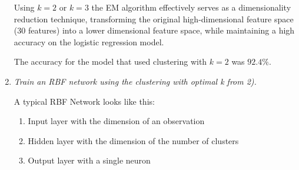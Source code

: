 \documentclass{article}
\begin{document}
\begin{enumerate}
Using $k=2$ or $k=3$ the EM algorithm effectively serves as a
dimensionality reduction technique, transforming the original
high-dimensional feature space (30 features) into a lower
dimensional feature space, while maintaining a high accuracy
on the logistic regression model.

The accuracy for the model that used clustering with $k=2$
was $92.4\%$.


  \item \textit{Train an RBF network using the clustering with optimal k from 2).}

A typical RBF Network looks like this:
\begin{enumerate}
    \item Input layer with the dimension of an observation
    \item Hidden layer with the dimension of the number of clusters
    \item Output layer with a single neuron
\end{enumerate}


\end{enumerate}
\end{document}
